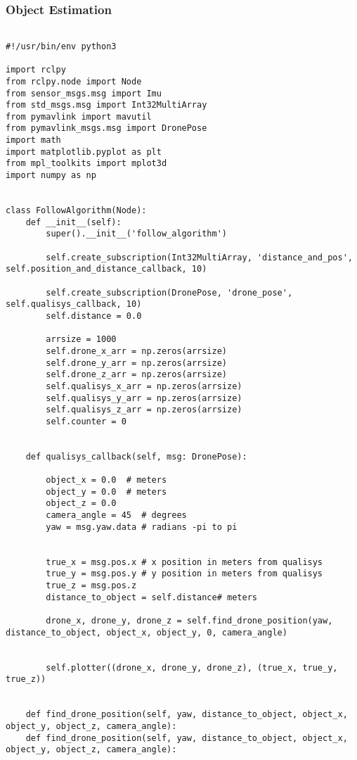 \subsubsection{Object Estimation}
\begin{lstlisting}[language=PythonPlus, basicstyle=\tiny,]

#!/usr/bin/env python3

import rclpy
from rclpy.node import Node
from sensor_msgs.msg import Imu
from std_msgs.msg import Int32MultiArray
from pymavlink import mavutil
from pymavlink_msgs.msg import DronePose
import math
import matplotlib.pyplot as plt
from mpl_toolkits import mplot3d
import numpy as np


class FollowAlgorithm(Node):
    def __init__(self): 
        super().__init__('follow_algorithm') 

        self.create_subscription(Int32MultiArray, 'distance_and_pos', self.position_and_distance_callback, 10)
        
        self.create_subscription(DronePose, 'drone_pose', self.qualisys_callback, 10)
        self.distance = 0.0

        arrsize = 1000
        self.drone_x_arr = np.zeros(arrsize)
        self.drone_y_arr = np.zeros(arrsize)
        self.drone_z_arr = np.zeros(arrsize)
        self.qualisys_x_arr = np.zeros(arrsize)
        self.qualisys_y_arr = np.zeros(arrsize)
        self.qualisys_z_arr = np.zeros(arrsize)
        self.counter = 0
        
        
    def qualisys_callback(self, msg: DronePose):

        object_x = 0.0  # meters
        object_y = 0.0  # meters
        object_z = 0.0
        camera_angle = 45  # degrees
        yaw = msg.yaw.data # radians -pi to pi
            

        true_x = msg.pos.x # x position in meters from qualisys
        true_y = msg.pos.y # y position in meters from qualisys
        true_z = msg.pos.z
        distance_to_object = self.distance# meters

        drone_x, drone_y, drone_z = self.find_drone_position(yaw, distance_to_object, object_x, object_y, 0, camera_angle)


        self.plotter((drone_x, drone_y, drone_z), (true_x, true_y, true_z))


    def find_drone_position(self, yaw, distance_to_object, object_x, object_y, object_z, camera_angle):
    def find_drone_position(self, yaw, distance_to_object, object_x, object_y, object_z, camera_angle):
    

\end{lstlisting}
